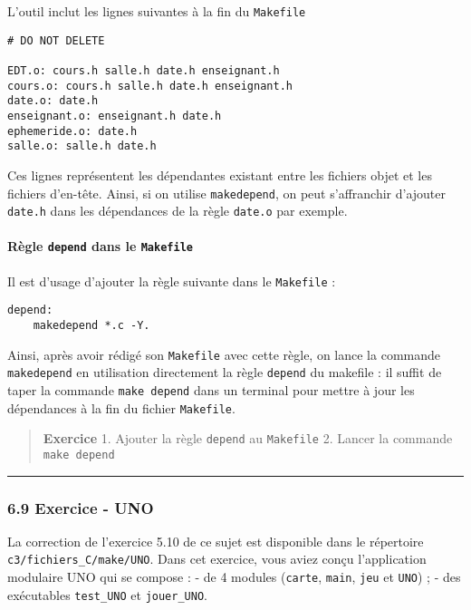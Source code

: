 \documentclass[11pt]{article}
\begin{document}
L'outil inclut les lignes suivantes à la fin du \texttt{Makefile}

\begin{verbatim}
# DO NOT DELETE

EDT.o: cours.h salle.h date.h enseignant.h
cours.o: cours.h salle.h date.h enseignant.h
date.o: date.h
enseignant.o: enseignant.h date.h
ephemeride.o: date.h
salle.o: salle.h date.h
\end{verbatim}

Ces lignes représentent les dépendantes existant entre les fichiers
objet et les fichiers d'en-tête. Ainsi, si on utilise
\texttt{makedepend}, on peut s'affranchir d'ajouter \texttt{date.h} dans
les dépendances de la règle \texttt{date.o} par exemple.

\paragraph{\texorpdfstring{Règle \texttt{depend} dans le
\texttt{Makefile}}{Règle depend dans le Makefile}}\label{ruxe8gle-depend-dans-le-makefile}

Il est d'usage d'ajouter la règle suivante dans le \texttt{Makefile} :

\begin{verbatim}
depend: 
    makedepend *.c -Y.
\end{verbatim}

Ainsi, après avoir rédigé son \texttt{Makefile} avec cette règle, on
lance la commande \texttt{makedepend} en utilisation directement la
règle \texttt{depend} du makefile : il suffit de taper la commande
\texttt{make\ depend} dans un terminal pour mettre à jour les
dépendances à la fin du fichier \texttt{Makefile}.

\begin{quote}
\textbf{Exercice} 1. Ajouter la règle \texttt{depend} au
\texttt{Makefile} 2. Lancer la commande \texttt{make\ depend}
\end{quote}

    \begin{center}\rule{0.5\linewidth}{\linethickness}\end{center}

    \subsubsection{6.9 Exercice - UNO}\label{exercice---uno}

La correction de l'exercice 5.10 de ce sujet est disponible dans le
répertoire \texttt{c3/fichiers\_C/make/UNO}. Dans cet exercice, vous
aviez conçu l'application modulaire UNO qui se compose : - de 4 modules
(\texttt{carte}, \texttt{main}, \texttt{jeu} et \texttt{UNO}) ; - des
exécutables \texttt{test\_UNO} et \texttt{jouer\_UNO}.
\end{document}
